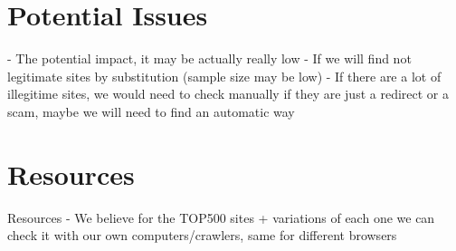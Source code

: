 \documentclass[letterpaper,twocolumn,10pt]{article}
\begin{document}
\section{Potential Issues}
- The potential impact, it may be actually really low
- If we will find not legitimate sites by substitution (sample size may be low)
- If there are a lot of illegitime sites, we would need to check manually if they are just a redirect or a scam, maybe we will need to find an automatic way

\section{Resources}
Resources
- We believe for the TOP500 sites + variations of each one we can check it with our own computers/crawlers, same for different browsers
\end{document}
